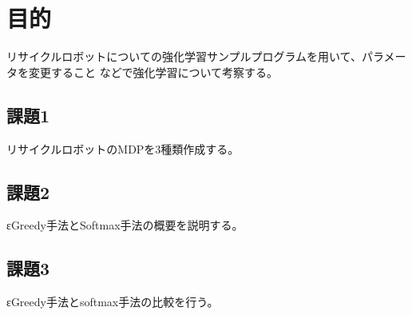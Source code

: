 \section{目的}
リサイクルロボットについての強化学習サンプルプログラムを用いて、パラメータを変更すること
などで強化学習について考察する。
\subsection{課題1}
リサイクルロボットのMDPを3種類作成する。

\subsection{課題2}
εGreedy手法とSoftmax手法の概要を説明する。

\subsection{課題3}
εGreedy手法とsoftmax手法の比較を行う。